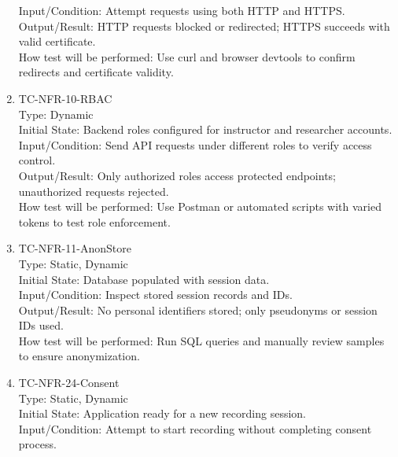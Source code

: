\documentclass[12pt, titlepage]{article}
\begin{document}
\begin{enumerate}
Input/Condition: Attempt requests using both HTTP and HTTPS.\\

Output/Result: HTTP requests blocked or redirected; HTTPS succeeds with valid certificate.\\

How test will be performed: Use curl and browser devtools to confirm redirects and certificate validity.

\item{TC-NFR-10-RBAC\\}
Type: Dynamic\\

Initial State: Backend roles configured for instructor and researcher accounts.\\

Input/Condition: Send API requests under different roles to verify access control.\\

Output/Result: Only authorized roles access protected endpoints; unauthorized requests rejected.\\

How test will be performed: Use Postman or automated scripts with varied tokens to test role enforcement.

\item{TC-NFR-11-AnonStore\\}
Type: Static, Dynamic\\

Initial State: Database populated with session data.\\

Input/Condition: Inspect stored session records and IDs.\\

Output/Result: No personal identifiers stored; only pseudonyms or session IDs used.\\

How test will be performed: Run SQL queries and manually review samples to ensure anonymization.

\item{TC-NFR-24-Consent\\}
Type: Static, Dynamic\\

Initial State: Application ready for a new recording session.\\

Input/Condition: Attempt to start recording without completing consent process.\\


\end{enumerate}
\end{document}
